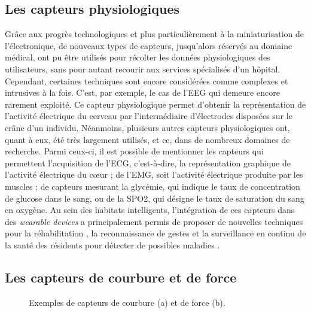 \subsection{Les capteurs physiologiques}

Grâce aux progrès technologiques et plus particulièrement à la miniaturisation de l'électronique, de nouveaux types de capteurs, jusqu'alors réservés au domaine médical, ont pu être utilisés pour récolter les données physiologiques des utilisateurs, sans pour autant recourir aux services spécialisés d'un hôpital. Cependant, certaines techniques sont encore considérées comme complexes et intrusives à la fois. C'est, par exemple, le cas de l'\ac{EEG} qui demeure encore rarement exploité. Ce capteur physiologique permet d'obtenir la représentation de l'activité électrique du cerveau par l'intermédiaire d'électrodes disposées sur le crâne d'un individu. Néanmoins, plusieurs autres capteurs physiologiques ont, quant à eux, été très largement utilisés, et ce, dans de nombreux domaines de recherche. Parmi ceux-ci, il est possible de mentionner les capteurs qui permettent l'acquisition de l'\ac{ECG}, c'est-à-dire, la représentation graphique de l'activité électrique du c\oe{}ur ; de l'\ac{EMG}, soit l'activité électrique produite par les muscles ; de capteurs mesurant la glycémie, qui indique le taux de concentration de glucose dans le sang, ou de la \ac{SPO2}, qui désigne le taux de saturation du sang en oxygène. Au sein des habitats intelligents, l'intégration de ces capteurs dans des \textit{wearable devices} a principalement permis de proposer de nouvelles techniques pour la réhabilitation \citep{YuanJieFan2014}, la reconnaissance de gestes \citep{Jung2015, Benatti2015, Tavakoli2018} et la surveillance en continu de la santé des résidents pour détecter de possibles maladies \citep{Istepanian2011, Adib2015, Khan2016}.

\subsection{Les capteurs de courbure et de force}

\begin{figure}[b!]
    \centering
    \hspace*{2cm}
    \caption{Exemples de capteurs de courbure (a) et de force (b).}
    \label{fig:flex_force_sensors}
\end{figure}

